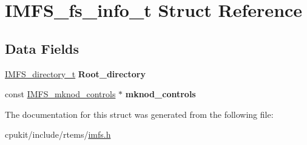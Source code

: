 \hypertarget{structIMFS__fs__info__t}{}\section{I\+M\+F\+S\+\_\+fs\+\_\+info\+\_\+t Struct Reference}
\label{structIMFS__fs__info__t}
\subsection*{Data Fields}
\begin{DoxyCompactItemize}
\item 
\mbox{\label{structIMFS__fs__info__t_ae6bdfba3bb6af193056eb012337bc977}} 
\mbox{\hyperlink{structIMFS__directory__t}{I\+M\+F\+S\+\_\+directory\+\_\+t}} {\bfseries Root\+\_\+directory}
\item 
\mbox{\label{structIMFS__fs__info__t_af0426075c526adcf8594c30291416aec}} 
const \mbox{\hyperlink{structIMFS__mknod__controls}{I\+M\+F\+S\+\_\+mknod\+\_\+controls}} $\ast$ {\bfseries mknod\+\_\+controls}
\end{DoxyCompactItemize}


The documentation for this struct was generated from the following file\+:\begin{DoxyCompactItemize}
\item 
cpukit/include/rtems/\mbox{\hyperlink{imfs_8h}{imfs.\+h}}\end{DoxyCompactItemize}
